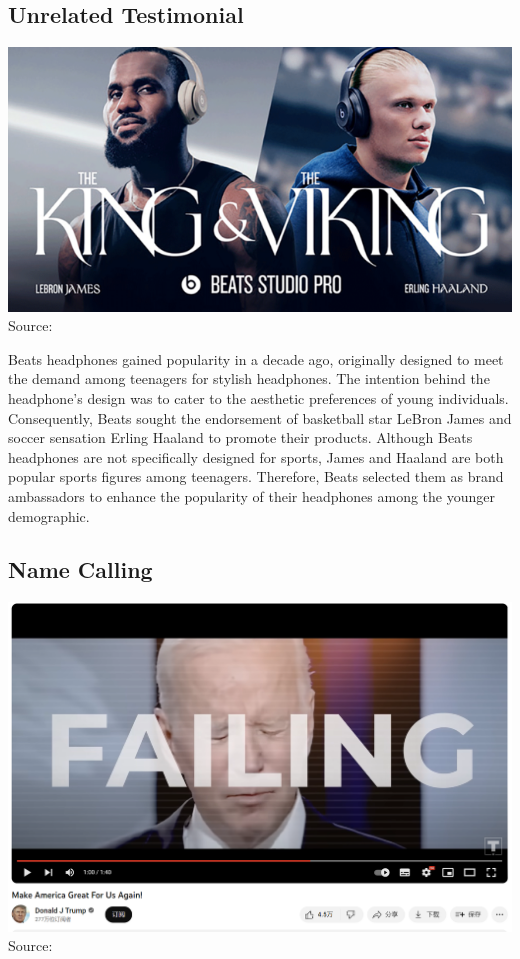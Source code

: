 \documentclass[12pt, a4paper]{article}
\begin{document}
\subsection*{Unrelated Testimonial}
\includegraphics[width=1\textwidth]{Figure.5.4.png}
Source: \cite{Kiefer_2023}

Beats headphones gained popularity in a decade ago, originally designed to meet the demand among teenagers for stylish headphones. The intention behind the headphone's design was to cater to the aesthetic preferences of young individuals. Consequently, Beats sought the endorsement of basketball star LeBron James and soccer sensation Erling Haaland to promote their products. Although Beats headphones are not specifically designed for sports, James and Haaland are both popular sports figures among teenagers. Therefore, Beats selected them as brand ambassadors to enhance the popularity of their headphones among the younger demographic.

\subsection*{Name Calling}
\includegraphics[width=1\textwidth]{Figure.5.5.png}
Source: \cite{MAGA_2023}
\end{document}
